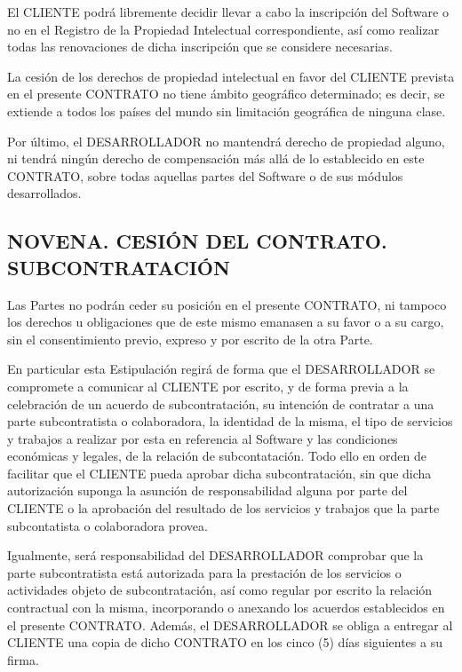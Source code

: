 \documentclass[a4paper,11pt]{report}
\begin{document}
	El CLIENTE podrá libremente decidir llevar a cabo la inscripción del
	Software o no en el Registro de la Propiedad Intelectual
	correspondiente, así como realizar todas las renovaciones de dicha
	inscripción que se considere necesarias.

	La cesión de los derechos de propiedad intelectual en favor del CLIENTE
	prevista en el presente CONTRATO no tiene ámbito geográfico determinado;
	es decir, se extiende a todos los países del mundo sin limitación
	geográfica de ninguna clase.

	Por último, el DESARROLLADOR no mantendrá derecho de propiedad alguno,
	ni tendrá ningún derecho de compensación más allá de lo establecido en
	este CONTRATO, sobre todas aquellas partes del Software o de sus módulos
	desarrollados.

	\subsection*{NOVENA. CESIÓN DEL CONTRATO. SUBCONTRATACIÓN}

	Las Partes no podrán ceder su posición en el presente CONTRATO, ni
	tampoco los derechos u obligaciones que de este mismo emanasen a su
	favor o a su cargo, sin el consentimiento previo, expreso y por escrito
	de la otra Parte.

	En particular esta Estipulación regirá de forma que el DESARROLLADOR se
	compromete a comunicar al CLIENTE por escrito, y de forma previa a la
	celebración de un acuerdo de subcontratación, su intención de contratar
	a una parte subcontratista o colaboradora, la identidad de la misma, el
	tipo de servicios y trabajos a realizar por esta en referencia al
	Software y las condiciones económicas y legales, de la relación de
	subcontatación. Todo ello en orden de facilitar que el CLIENTE pueda
	aprobar dicha subcontratación, sin que dicha autorización suponga la
	asunción de responsabilidad alguna por parte del CLIENTE o la aprobación
	del resultado de los servicios y trabajos que la parte subcontatista o
	colaboradora provea.

	Igualmente, será responsabilidad del DESARROLLADOR comprobar que la
	parte subcontratista está autorizada para la prestación de los servicios
	o actividades objeto de subcontratación, así como regular por escrito la
	relación contractual con la misma, incorporando o anexando los acuerdos
	establecidos en el presente CONTRATO. Además, el DESARROLLADOR se obliga
	a entregar al CLIENTE una copia de dicho CONTRATO en los cinco (5) días
	siguientes a su firma.
\end{document}

